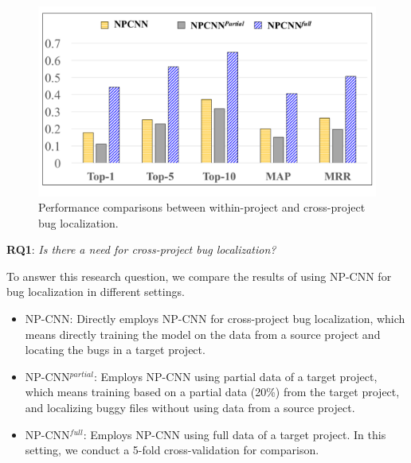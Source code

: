 \begin{table}[htbp]
  \label{tab:results1}%
\end{table}%


\begin{figure}[hbt]
\centering
\includegraphics[width = 0.9\columnwidth]{pic/results1_avg.pdf}
\caption{Performance comparisons between within-project and cross-project bug localization.}
\label{fig:results1}
\end{figure}


\textbf{RQ1}: \textit{Is there a need for cross-project bug localization?}

To answer this research question, we compare the results of using NP-CNN for bug localization in different settings.

\begin{itemize}
  \item NP-CNN: Directly employs NP-CNN for cross-project bug localization, which means directly training the model on the data from a source project and locating the bugs in a target project.
  \item NP-CNN$^{partial}$: Employs NP-CNN using partial data of a target project, which means training based on a partial data (20\%) from the target project, and localizing buggy files without using data from a source project.
  \item NP-CNN$^{full}$: Employs NP-CNN using full data of a target project. In this setting, we conduct a 5-fold cross-validation for comparison.
\end{itemize}

